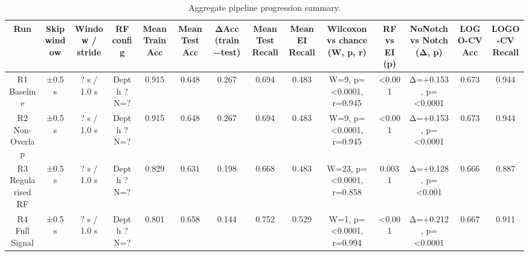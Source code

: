 \begin{table}[hptb]
\small
\centering
\begin{table}
\caption{Aggregate pipeline progression summary.}
\label{tab:table2_aggregate}
\begin{tabular}{cccccccccccccc}
\toprule
Run & Skip window & Window / stride & RF config & Mean Train Acc & Mean Test Acc & ΔAcc (train−test) & Mean Test Recall & Mean EI Recall & Wilcoxon vs chance (W, p, r) & RF vs EI (p) & NoNotch vs Notch (Δ, p) & LOGO-CV Acc & LOGO-CV Recall \\
\midrule
R1 Baseline & ±0.5 s & ? s / 1.0 s & Depth ? N=? & 0.915 & 0.648 & 0.267 & 0.694 & 0.483 & W=9, p=<0.0001, r=0.945 & <0.001 & Δ=+0.153, p=<0.0001 & 0.673 & 0.944 \\
R2 Non-Overlap & ±0.5 s & ? s / 1.0 s & Depth ? N=? & 0.915 & 0.648 & 0.267 & 0.694 & 0.483 & W=9, p=<0.0001, r=0.945 & <0.001 & Δ=+0.153, p=<0.0001 & 0.673 & 0.944 \\
R3 Regularised RF & ±0.5 s & ? s / 1.0 s & Depth ? N=? & 0.829 & 0.631 & 0.198 & 0.668 & 0.483 & W=23, p=<0.0001, r=0.858 & 0.0031 & Δ=+0.128, p=<0.001 & 0.666 & 0.887 \\
R4 Full Signal & ±0.5 s & ? s / 1.0 s & Depth ? N=? & 0.801 & 0.658 & 0.144 & 0.752 & 0.529 & W=1, p=<0.0001, r=0.994 & <0.001 & Δ=+0.212, p=<0.0001 & 0.667 & 0.911 \\
\bottomrule
\end{tabular}
\end{table}
\end{table}
